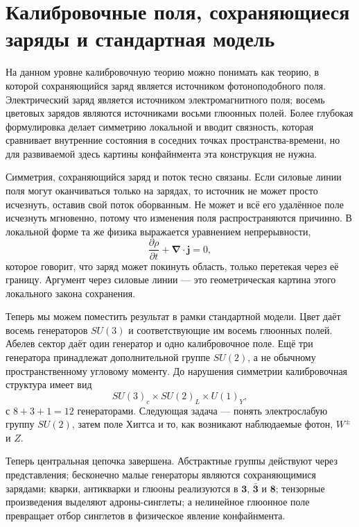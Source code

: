 \section{Калибровочные поля, сохраняющиеся заряды и стандартная модель}

На данном уровне калибровочную теорию можно понимать как теорию, в которой сохраняющийся заряд является источником фотоноподобного поля. Электрический заряд является источником электромагнитного поля; восемь цветовых зарядов являются источниками восьми глюонных полей. Более глубокая формулировка делает симметрию локальной и вводит связность, которая сравнивает внутренние состояния в соседних точках пространства-времени, но для развиваемой здесь картины конфайнмента эта конструкция не нужна.

Симметрия, сохраняющийся заряд и поток тесно связаны. Если силовые линии поля могут оканчиваться только на зарядах, то источник не может просто исчезнуть, оставив свой поток оборванным. Не может и всё его удалённое поле исчезнуть мгновенно, потому что изменения поля распространяются причинно. В локальной форме та же физика выражается уравнением непрерывности,
\begin{equation}
\frac{\partial\rho}{\partial t}
+\boldsymbol\nabla\cdot\boldsymbol j=0,
\end{equation}
которое говорит, что заряд может покинуть область, только перетекая через её границу. Аргумент через силовые линии — это геометрическая картина этого локального закона сохранения.

Теперь мы можем поместить результат в рамки стандартной модели. Цвет даёт восемь генераторов \(SU(3)\) и соответствующие им восемь глюонных полей. Абелев сектор даёт один генератор и одно калибровочное поле. Ещё три генератора принадлежат дополнительной группе \(SU(2)\), а не обычному пространственному угловому моменту. До нарушения симметрии калибровочная структура имеет вид
\begin{equation}
SU(3)_c\times SU(2)_L\times U(1)_Y,
\end{equation}
с \(8+3+1=12\) генераторами. Следующая задача — понять электрослабую группу \(SU(2)\), затем поле Хиггса и то, как возникают наблюдаемые фотон, \(W^\pm\) и \(Z\).

Теперь центральная цепочка завершена. Абстрактные группы действуют через представления; бесконечно малые генераторы являются сохраняющимися зарядами; кварки, антикварки и глюоны реализуются в \(\boldsymbol 3\), \(\bar{\boldsymbol 3}\) и \(\boldsymbol 8\); тензорные произведения выделяют адроны-синглеты; а нелинейное глюонное поле превращает отбор синглетов в физическое явление конфайнмента.